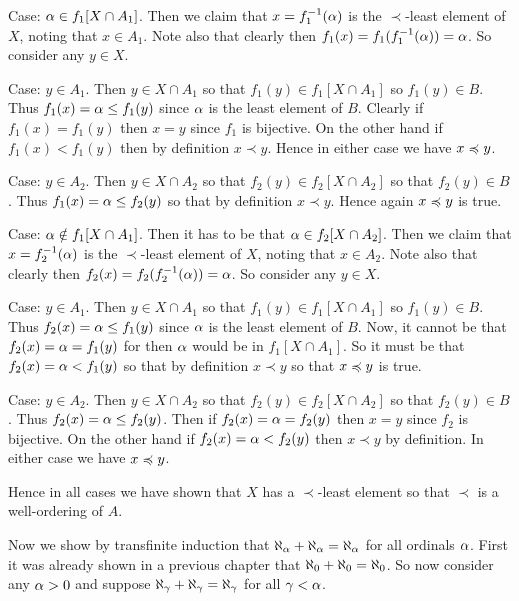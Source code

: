 {{    Case: $\alpha \in f_1[X \cap A_1]$.
    Then we claim that $x = f_1^{-1}(\alpha)$ is the $\prec$-least element of $X$, noting that $x \in A_1$.
    Note also that clearly then $f_1(x) = f_1(f_1^{-1}(\alpha)) = \alpha$.
    So consider any $y \in X$.
    \begin{indpar}
      Case: $y \in A_1$.
      Then $y \in X \cap A_1$ so that $f_1(y) \in f_1[X \cap A_1]$ so $f_1(y) \in B$.
      Thus $f_1(x) = \alpha \leq f_1(y)$ since $\alpha$ is the least element of $B$.
      Clearly if $f_1(x) = f_1(y)$ then $x = y$ since $f_1$ is bijective.
      On the other hand if $f_1(x) < f_1(y)$ then by definition $x \prec y$.
      Hence in either case we have $x \preccurlyeq y$.

      Case: $y \in A_2$.
      Then $y \in X \cap A_2$ so that $f_2(y) \in f_2[X \cap A_2]$ so that $f_2(y) \in B$.
      Thus $f_1(x) = \alpha \leq f_2(y)$ so that by definition $x \prec y$.
      Hence again $x \preccurlyeq y$ is true.
    \end{indpar}

    Case: $\alpha \notin f_1[X \cap A_1]$.
    Then it has to be that $\alpha \in f_2[X \cap A_2]$.
    Then we claim that $x = f_2^{-1}(\alpha)$ is the $\prec$-least element of $X$, noting that $x \in A_2$.
    Note also that clearly then $f_2(x) = f_2(f_2^{-1}(\alpha)) = \alpha$.
    So consider any $y \in X$.
    \begin{indpar}
      Case: $y \in A_1$.
      Then $y \in X \cap A_1$ so that $f_1(y) \in f_1[X \cap A_1]$ so $f_1(y) \in B$.
      Thus $f_2(x) = \alpha \leq f_1(y)$ since $\alpha$ is the least element of $B$.
      Now, it cannot be that $f_2(x) = \alpha = f_1(y)$ for then $\alpha$ would be in $f_1[X \cap A_1]$.
      So it must be that $f_2(x) = \alpha < f_1(y)$ so that by definition $x \prec y$ so that $x \preccurlyeq y$ is true.

      Case: $y \in A_2$.
      Then $y \in X \cap A_2$ so that $f_2(y) \in f_2[X \cap A_2]$ so that $f_2(y) \in B$.
      Thus $f_2(x) = \alpha \leq f_2(y)$.
      Then if $f_2(x) = \alpha = f_2(y)$ then $x = y$ since $f_2$ is bijective.
      On the other hand if $f_2(x) = \alpha < f_2(y)$ then $x \prec y$ by definition.
      In either case we have $x \preccurlyeq y$.
    \end{indpar}
    Hence in all cases we have shown that $X$ has a $\prec$-least element so that $\prec$ is a well-ordering of $A$.

    Now we show by transfinite induction that $\aleph_\alpha + \aleph_\alpha = \aleph_\alpha$ for all ordinals $\alpha$.
    First it was already shown in a previous chapter that $\aleph_0 + \aleph_0 = \aleph_0$.
    So now consider any $\alpha > 0$ and suppose $\aleph_\gamma + \aleph_\gamma = \aleph_\gamma$ for all $\gamma < \alpha$.

}}
